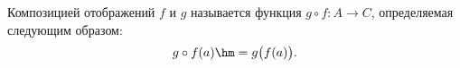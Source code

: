 
    Композицией отображений $f$ и $g$ называется функция $g\circ f\colon A\to C$, определяемая следующим образом:
    \[
        g\circ f(a)\hm=g\big(f(a)\big).
    \]
